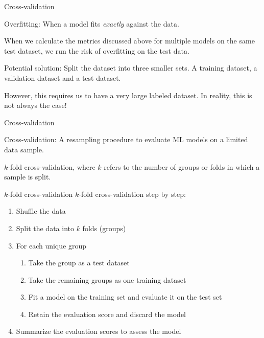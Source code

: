\documentclass[handout]{beamer}
\begin{document}
\begin{frame}{Cross-validation}
	
	Overfitting: When a model fits \emph{exactly} against the data.
	
	When we calculate the metrics discussed above for multiple models on the same test dataset, we run the risk of overfitting on the test data.
	
	Potential solution: Split the dataset into three smaller sets. A training dataset, a validation dataset and a test dataset.
	
	However, this requires us to have a very large labeled dataset. In reality, this is not always the case!
	
	
	
\end{frame}


\begin{frame}{Cross-validation}
	
	Cross-validation: A resampling procedure to evaluate ML models on a limited data sample.
	
	\(k\)-fold cross-validation, where \(k\) refers to the number of groups or folds in which a sample is split.

\end{frame}


\begin{frame}{\(k\)-fold cross-validation}
	\(k\)-fold cross-validation step by step:
	\begin{enumerate}
		\item Shuffle the data
		\item Split the data into \(k\) folds (groups)
		\item For each unique group
		\begin{enumerate}
			\item Take the group as a test dataset
			\item Take the remaining groups as one training dataset
			\item Fit a model on the training set and evaluate it on the test set
			\item Retain the evaluation score and discard the model
		\end{enumerate}
		\item Summarize the evaluation scores to assess the model \\\
	\end{enumerate}

\end{frame}
	
\end{document}
